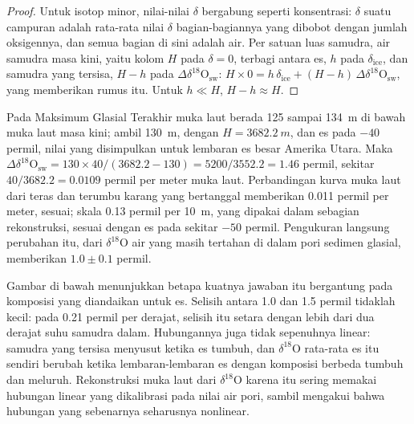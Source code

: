 \begin{proof}
Untuk isotop minor, nilai-nilai $\delta$ bergabung seperti konsentrasi: $\delta$ suatu campuran adalah
rata-rata nilai $\delta$ bagian-bagiannya yang dibobot dengan jumlah oksigennya, dan semua
bagian di sini adalah air. Per satuan luas samudra, air samudra masa kini, yaitu kolom $H$ pada
$\delta = 0$, terbagi antara es, $h$ pada $\delta_{\mathrm{ice}}$, dan samudra yang tersisa,
$H - h$ pada $\Delta\delta^{18}\mathrm{O}_{\mathrm{sw}}$:
$H \times 0 = h\,\delta_{\mathrm{ice}} + (H - h)\,\Delta\delta^{18}\mathrm{O}_{\mathrm{sw}}$, yang
memberikan rumus itu. Untuk $h \ll H$, $H - h \approx H$.
\end{proof}

\begin{example}\label{ex:b2:climate-proxies:lgm}
Pada Maksimum Glasial Terakhir muka laut berada 125 sampai \qty{134}{m} di bawah muka laut masa kini; ambil \qty{130}{m},
dengan $H = \qty{3682.2}{m}$, dan es pada $-40$ permil, nilai yang disimpulkan untuk lembaran es besar Amerika
Utara. Maka
$\Delta\delta^{18}\mathrm{O}_{\mathrm{sw}} = 130 \times 40/(3682.2 - 130) = 5200/3552.2 = 1.46$
permil, sekitar $40/3682.2 = 0.0109$ permil per meter muka laut. Perbandingan kurva muka laut
dari teras dan terumbu karang yang bertanggal memberikan \num{0.011} permil per meter, sesuai; skala
\num{0.13} permil per \qty{10}{m}, yang dipakai dalam sebagian rekonstruksi, sesuai dengan es pada sekitar
$-50$ permil. Pengukuran langsung perubahan itu, dari $\delta^{18}$O air yang masih tertahan
di dalam pori sedimen glasial, memberikan $1.0 \pm 0.1$ permil.
\end{example}

Gambar di bawah menunjukkan betapa kuatnya jawaban itu bergantung pada komposisi yang diandaikan untuk es.
Selisih antara \num{1.0} dan \num{1.5} permil tidaklah kecil: pada \num{0.21} permil per derajat,
selisih itu setara dengan lebih dari dua derajat suhu samudra dalam. Hubungannya juga tidak sepenuhnya
linear: samudra yang tersisa menyusut ketika es tumbuh, dan $\delta^{18}$O rata-rata es
itu sendiri berubah ketika lembaran-lembaran es dengan komposisi berbeda tumbuh dan meluruh. Rekonstruksi muka laut
dari $\delta^{18}$O karena itu sering memakai hubungan linear yang dikalibrasi pada nilai air pori, sambil
mengakui bahwa hubungan yang sebenarnya seharusnya nonlinear.

